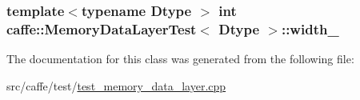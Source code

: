 \hypertarget{classcaffe_1_1_memory_data_layer_test_a3488d10fa611d4deadbf238c288e1572}{
\subsubsection[{width\+\_\+}]{\setlength{\rightskip}{0pt plus 5cm}template$<$typename Dtype $>$ int {\bf caffe\+::\+Memory\+Data\+Layer\+Test}$<$ Dtype $>$\+::width\+\_\+\hspace{0.3cm}{\ttfamily [protected]}}}\label{classcaffe_1_1_memory_data_layer_test_a3488d10fa611d4deadbf238c288e1572}


The documentation for this class was generated from the following file\+:\begin{DoxyCompactItemize}
\item 
src/caffe/test/\hyperlink{test__memory__data__layer_8cpp}{test\+\_\+memory\+\_\+data\+\_\+layer.\+cpp}\end{DoxyCompactItemize}
